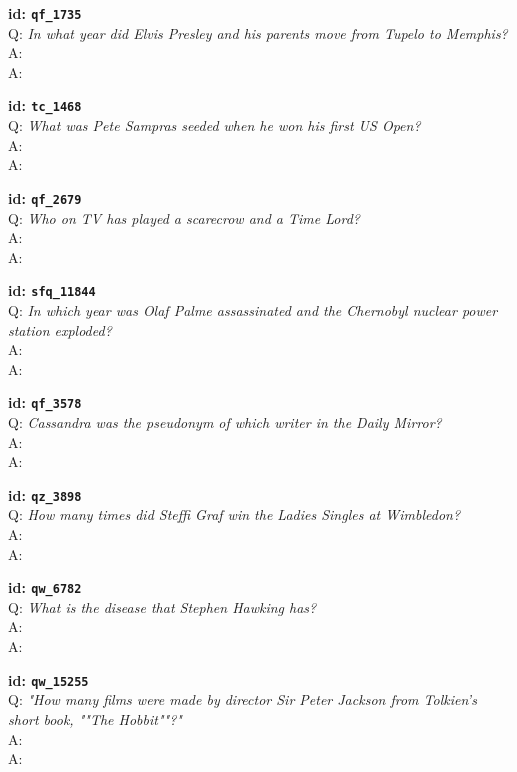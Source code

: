 \tiny{\setlength{\parindent}{0cm}
\textbf{id: \texttt{qf\_1735}} \\
Q: \textit{In what year did Elvis Presley and his parents move from Tupelo to Memphis?} \\
A:  \\
A: }

\tiny{\setlength{\parindent}{0cm}
\textbf{id: \texttt{tc\_1468}} \\
Q: \textit{What was Pete Sampras seeded when he won his first US Open?} \\
A:  \\
A: }

\tiny{\setlength{\parindent}{0cm}
\textbf{id: \texttt{qf\_2679}} \\
Q: \textit{Who on TV has played a scarecrow and a Time Lord?} \\
A:  \\
A: }

\tiny{\setlength{\parindent}{0cm}
\textbf{id: \texttt{sfq\_11844}} \\
Q: \textit{In which year was Olaf Palme assassinated and the Chernobyl nuclear power station exploded?} \\
A:  \\
A: }

\tiny{\setlength{\parindent}{0cm}
\textbf{id: \texttt{qf\_3578}} \\
Q: \textit{Cassandra was the pseudonym of which writer in the Daily Mirror?} \\
A:  \\
A: }

\tiny{\setlength{\parindent}{0cm}
\textbf{id: \texttt{qz\_3898}} \\
Q: \textit{How many times did Steffi Graf win the Ladies Singles at Wimbledon?} \\
A:  \\
A: }

\tiny{\setlength{\parindent}{0cm}
\textbf{id: \texttt{qw\_6782}} \\
Q: \textit{What is the disease that Stephen Hawking has?} \\
A:  \\
A: }

\tiny{\setlength{\parindent}{0cm}
\textbf{id: \texttt{qw\_15255}} \\
Q: \textit{"How many films were made by director Sir Peter Jackson from Tolkien's short book, ""The Hobbit""?"} \\
A:  \\
A: }

